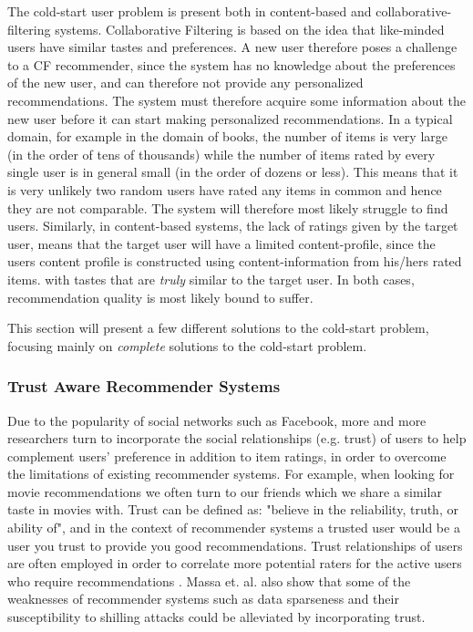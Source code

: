 The cold-start user problem is present both in content-based and
collaborative-filtering systems. Collaborative Filtering is based on the idea that like-minded users have similar tastes and
preferences. A new user therefore poses a challenge to a CF recommender, since
the system has no knowledge about the preferences of the new user, and can
therefore not provide any personalized recommendations. The system must therefore acquire some
information about the new user before it can start making personalized recommendations. In a typical domain, for example in the domain of books, the number of items is very large (in the order of tens of thousands) while the number of items rated by every single user is in general small (in the order of dozens or less). This means that it is very unlikely two random users have rated any items in common and hence they are not comparable. The system will therefore most likely struggle to find users. Similarly, in content-based systems, the lack of ratings
given by the target user, means that the target user will have a limited
content-profile, since the users content profile is constructed using content-information from his/hers rated items. 
with tastes that are \emph{truly} similar to the target user. In both cases, recommendation quality is most likely bound to suffer.
		
This section will present a few different solutions to the cold-start problem, focusing mainly on \emph{complete} solutions to the cold-start problem. 

\subsubsection{Trust Aware Recommender Systems}

Due to the popularity of social networks such as Facebook, more and more
researchers turn to incorporate the social relationships (e.g. trust) of users
to help complement users’ preference in addition to item ratings, in order to overcome the limitations of existing recommender systems. For example, when looking for movie recommendations we often turn to our friends which we share a similar taste in movies with. Trust can be defined as: "believe in the reliability, truth, or ability of", and in the context of recommender systems a trusted user would be a user you trust to provide you good recommendations. Trust relationships of users are often employed in order to correlate more potential raters for the active users who require recommendations \cite{Massa2004, Massa2007}. Massa et. al. \citep{Massa2004} also show that some of the weaknesses of recommender systems such as data sparseness and their susceptibility to shilling attacks could be alleviated by incorporating trust. 

